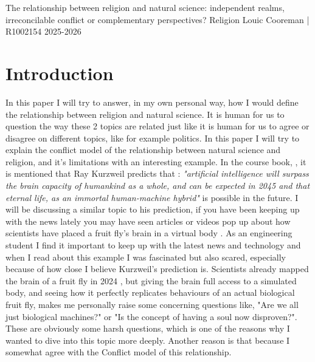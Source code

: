 \documentclass[a4paper,12pt,twoside]{report}
\begin{document}
\kuleuventitle
{The relationship between religion and natural science: independent 
realms, irreconcilable conflict or complementary perspectives?}
{Religion}
{Louic Cooreman | R1002154}
{2025-2026}

\newpage
\tableofcontents
\newpage

\chapter{Introduction}
In this paper I will try to answer, in my own personal way, how I would define the relationship between religion and natural science. 
It is human for us to question the way these 2 topics are related just like it is human for us to agree or disagree on different topics, 
like for example politics. In this paper I will try to explain the conflict model of the relationship between natural science and religion, and it's limitations with an interesting example.
\newline
\newline
In the course book, \cite[Chapter 8, p. 344]{depoortere2023living}, it is mentioned that Ray Kurzweil predicts that : \textit{"artificial intelligence will surpass the brain capacity of humankind as a whole, and can be expected in 2045 and that eternal life, as an immortal human-machine hybrid"} is possible in the future. I will be discussing a similar topic to his prediction, if you have been keeping up with the news lately you may have seen articles or videos pop up about how scientists have placed a fruit fly's brain in a virtual body \cite{turkiyetoday2026fruitfly}.
\newline
\newline
As an engineering student I find it important to keep up with the latest news and technology and when I read about this example I was fascinated but also scared, especially because of how close I believe Kurzweil's prediction is. 
Scientists already mapped the brain of a fruit fly in 2024 \cite{brainfacts2024connectome}, 
but giving the brain full access to a simulated body, and seeing how it perfectly replicates behaviours of an actual biological fruit fly, 
makes me personally raise some concerning questions like, "Are we all just biological machines?" or "Is the concept of having a soul now disproven?".
 These are obviously some harsh questions, which is one of the reasons why I wanted to dive into this topic more deeply. Another reason is that because I somewhat agree with the Conflict model of this relationship.
\end{document}
